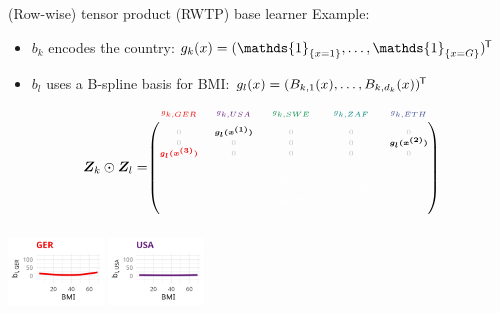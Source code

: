 \documentclass[t,10pt]{beamer}
\begin{document}
\begin{frame}{(Row-wise) tensor product (RWTP) base learner}
  Example:
  \begin{itemize}
    \item $b_k$ encodes the country: $g_k(x) = (\mathds{1}_{\{x = 1\}}, \dots, \mathds{1}_{\{x = G\}})^\tran$
    \item $b_l$ uses a B-spline basis for BMI: $g_l(x) = (B_{k,1}(x), \dots, B_{k,d_k}(x))^{\mkern-1.5mu\mathsf{T}}$
  \end{itemize}
  $$
    \design_k \odot \design_l = \tiny\begin{blockarray}{ccccc}
      \color[HTML]{EE0000}g_{k,GER} & \color[HTML]{631879}g_{k,USA} & \color[HTML]{008B45}g_{k,SWE} & \color[HTML]{008280}g_{k,ZAF} & \color[HTML]{3B4992}g_{k,ETH}\\
    \begin{block}{(ccccc)}
      \phantom{x}\\
      \color{lightgray}0 & \color{black}\bm{g_l(x^{(1)})} & \color{lightgray}0 & \color{lightgray}0 & \color{lightgray}0 \\
      \color{lightgray}0 & \color{lightgray}0 & \color{lightgray}0 & \color{lightgray}0 & \color{black}\bm{g_l(x^{(2)})} \\
      \color[HTML]{EE0000}\bm{g_l(x^{(3)})} & \color{lightgray}0 & \color{lightgray}0 & \color{lightgray}0 & \color{lightgray}0 \\
      \color{white}\vdots & \color{white}\vdots & \color{white}\vdots & \color{white}\vdots & \color{white}\vdots \\
      \color{white}0 & \color{white}0 & \color{white}\bm{g_l(x^{(73)})} & \color{white}0 & \color{white}0 \\
      \color{white}0 & \color{white}0 & \color{white}0 & \color{white}\bm{g_l(x^{(74)})} & \color{white}0 \\
      \color{white}0 & \color{white}0 & \color{white}\bm{g_l(x^{(75)})} & \color{white}0 & \color{white}0 \\
      \phantom{x}\\
    \end{block}
  \end{blockarray}
  $$
  \normalsize
  \includegraphics[width=0.19\textwidth]{figures/bs-tensor/fig-tensor-GER.png}
  {\includegraphics[width=0.19\textwidth]{figures/bs-tensor/fig-tensor-USA.png}}

\end{frame}
\end{document}
